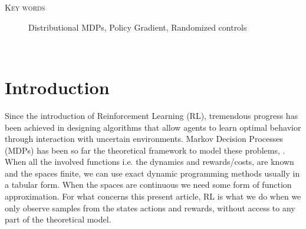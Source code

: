 \documentclass[reqno, 11pt]{amsart}%
\theoremstyle{definition}
\begin{document}
\maketitle

\makeatletter \providecommand{} \makeatother

\vspace{0.5cm}
\begin{minipage}{14cm}
{\small
\begin{description}
\item[\rm \textsc{ Key words}]
{\small Distributional MDPs, Policy Gradient, Randomized controls }

\end{description}
}
\end{minipage}\\

\section{Introduction}
Since the introduction of Reinforcement Learning (RL), tremendous progress has been achieved in designing algorithms that allow agents to learn optimal behavior through interaction with uncertain environments. Markov Decision Processes (MDPs) has been so far the theoretical framework to model these problems, \cite{Puterman1994MDP, Bertsekas-Shreve,Powell2011ADP,BauerleRieder}. When all the involved functions i.e. the dynamics and rewards/costs, are known and the spaces finite, we can use exact dynamic programming methods usually in a tabular form. When the spaces are continuous we need some form of function approximation. For what concerns this present article, RL is what we do when we only observe samples from the states actions and rewards, without access to any part of the theoretical model.     
 
\end{document}

